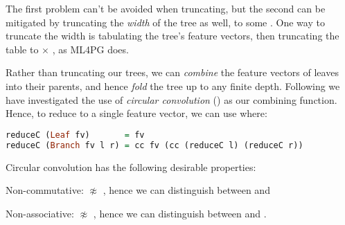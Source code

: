 \documentclass[]{article}
\begin{document}
The first problem can't be avoided when truncating, but the second can be mitigated by truncating the \emph{width} of the tree as well, to some . One way to truncate the width is tabulating the tree's feature vectors, then truncating the table to  $\times$ , as ML4PG does.

\iffalse

We can do this with \hs{tabulate w d t}:

\begin{lstlisting}[language=Haskell, xleftmargin=.2\textwidth, xrightmargin=.2\textwidth]
tabulate w d t = take d (map (take w) (tabulate' t))

tabulate' (Leaf   fv)     = [fv] : []
tabulate' (Branch fv l r) = [fv] : merge (tabulate' l) (tabulate' r)

merge    []     ys  = ys
merge    xs     []  = xs
merge (x:xs) (y:ys) = (x ++ y) : merge xs ys
\end{lstlisting}

\fi

Rather than truncating our trees, we can \emph{combine} the feature vectors of leaves into their parents, and hence \emph{fold} the tree up to any finite depth. Following \cite{zanzotto2012distributed} we have investigated the use of \emph{circular convolution} () as our combining function. Hence, to reduce  to a single feature vector, we can use  where:

\begin{lstlisting}[language=Haskell, xleftmargin=.2\textwidth, xrightmargin=.2\textwidth]
reduceC (Leaf fv)       = fv
reduceC (Branch fv l r) = cc fv (cc (reduceC l) (reduceC r))
\end{lstlisting}

Circular convolution has the following desirable properties:

\begin{description}

  \item{Non-commutative}:  $\not\approx$ , hence we can distinguish between  and 

  \item{Non-associative}:  $\not\approx$ , hence we can distinguish between  and .

\end{description}
\end{document}
